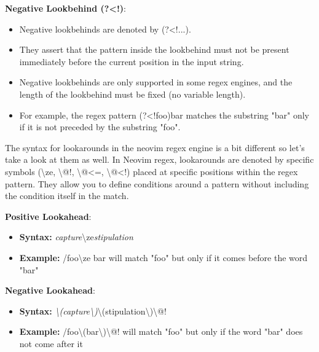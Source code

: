 \documentclass{report}
\begin{document}
    \bigbreak \noindent 
    \textbf{Negative Lookbehind (?<!)}:
    \begin{itemize}
        \item Negative lookbehinds are denoted by (?<!...).
        \item They assert that the pattern inside the lookbehind must not be present immediately before the current position in the input string.
        \item Negative lookbehinds are only supported in some regex engines, and the length of the lookbehind must be fixed (no variable length).
        \item For example, the regex pattern (?<!foo)bar matches the substring "bar" only if it is not preceded by the substring "foo".
    \end{itemize}

    \bigbreak \noindent 

    \pagebreak \bigbreak \noindent
    \bigbreak \noindent 
    The syntax for lookarounds in the neovim regex engine is a bit different so let's take a look at them as well.
    \bigbreak \noindent 
    In Neovim regex, lookarounds are denoted by specific symbols (\textbackslash ze, \textbackslash @!, \textbackslash @<=, \textbackslash @<!) placed at specific positions within the regex pattern. They allow you to define conditions around a pattern without including the condition itself in the match.  

    \bigbreak \noindent 
    \textbf{Positive Lookahead}:
    \begin{itemize}
        \item \textbf{Syntax:} \textit{capture}\textbackslash ze\textit{stipulation}
        \item \textbf{Example:} /foo\textbackslash ze bar will match "foo" but only if it comes before the word "bar"
    \end{itemize}

    \bigbreak \noindent 
    \textbf{Negative Lookahead}:
    \begin{itemize}
        \item \textbf{Syntax:} \textit{\textbackslash(capture\textbackslash )}\textbackslash(stipulation\textbackslash)\textbackslash @!
        \item \textbf{Example:} /foo\textbackslash(bar\textbackslash)\textbackslash @! will match "foo" but only if the word "bar" does not come after it
    \end{itemize}
\end{document}
